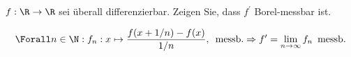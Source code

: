 \begin{exercise}

$f: \R \to \R$ sei überall differenzierbar. Zeigen Sie, dass $f^\prime$ Borel-messbar ist.

\end{exercise}


\begin{solution}

\begin{align*}
  \Forall n \in \N:
  f_n: x \mapsto \frac{f(x + 1/n) - f(x)}{1/n},
  \enspace \text{messb.}
  \Rightarrow
  f^\prime = \lim_{n \to \infty} f_n
  \enspace \text{messb.}
\end{align*}

\end{solution}


